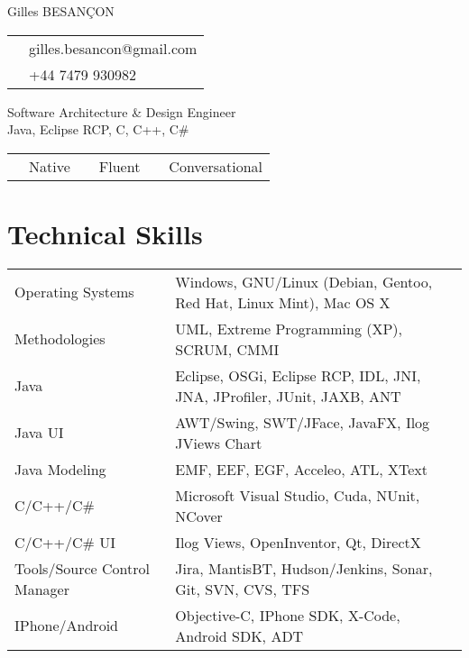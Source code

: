 \documentclass[10pt,letterpaper]{resume/resume}
\begin{document}
  \begin{minipage}[t]{\linewidth * 1 / 3}
    {\Large Gilles BESAN\c{C}ON}\\
      \begin{tabular}{c l}
         \email{&gilles.besancon@gmail.com}\\
         \phone{&+44 7479 930982}\\
      \end{tabular}
  \end{minipage}
  \begin{minipage}[t]{\linewidth * 2 / 3}
    \begin{center}
      {\huge{Software Architecture \& Design Engineer\\Java, Eclipse RCP, C, C++, C\#}}
      \begin{tabular}{c l c l c l}
      \french{French:&Native}&\englishus{English:&Fluent}&\spanish{Spanish:&Conversational}\\
      \end{tabular}
    \end{center}
  \end{minipage}
  
  \begin{minipage}[t]{\linewidth}
    \section{Technical Skills}
    \begin{tabular}{ll}
	Operating Systems&Windows, GNU/Linux (Debian, Gentoo, Red Hat, Linux Mint), Mac OS X\\
	Methodologies&UML, Extreme Programming (XP), SCRUM, CMMI\\
	Java&Eclipse, OSGi, Eclipse RCP, IDL, JNI, JNA, JProfiler, JUnit, JAXB, ANT\\
	Java UI&AWT/Swing, SWT/JFace, JavaFX, Ilog JViews Chart\\
	Java Modeling&EMF, EEF, EGF, Acceleo, ATL, XText\\
	C/C++/C\#&Microsoft Visual Studio, Cuda, NUnit, NCover\\
	C/C++/C\# UI&Ilog Views, OpenInventor, Qt, DirectX\\
	Tools/Source Control Manager&Jira, MantisBT, Hudson/Jenkins, Sonar, Git, SVN, CVS, TFS\\
	IPhone/Android&Objective-C, IPhone SDK, X-Code, Android SDK, ADT\\
    \end{tabular}
  \end{minipage}
  
\end{document}
